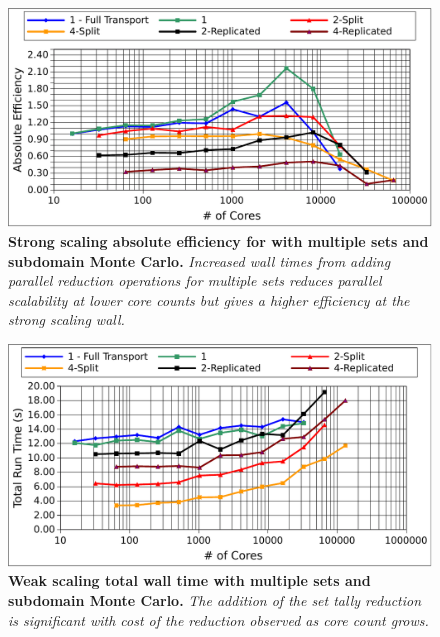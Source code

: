 \begin{figure}[t!]
  \begin{center}
    \includegraphics[width=6in]{chapters/parallel_mc/titan_strong_subdomain_ms.pdf}
  \end{center}
  \caption{\textbf{Strong scaling absolute efficiency for with
      multiple sets and subdomain Monte Carlo.} \textit{Increased wall
      times from adding parallel reduction operations for multiple
      sets reduces parallel scalability at lower core counts but gives
      a higher efficiency at the strong scaling wall.}}
  \label{fig:titan_strong_subdomain_ms}
\end{figure}

\begin{figure}[t!]
  \begin{center}
    \includegraphics[width=6in]{chapters/parallel_mc/titan_weak_subdomain_ms_time.pdf}
  \end{center}
  \caption{\textbf{Weak scaling total wall time with multiple sets and
      subdomain Monte Carlo.} \textit{The addition of the set tally
      reduction is significant with cost of the reduction observed as
      core count grows.}}
  \label{fig:titan_weak_subdomain_ms_time}
\end{figure}

